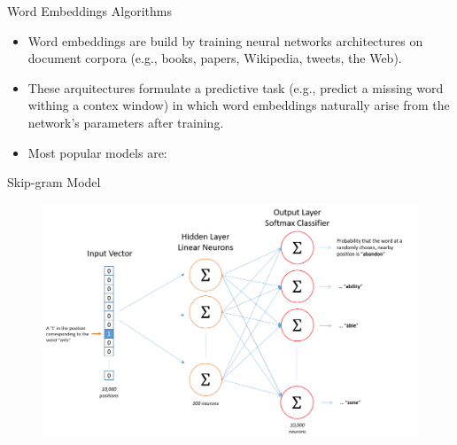\documentclass[handout]{beamer}
\begin{document}
\begin{frame}{Word Embeddings Algorithms}
\begin{scriptsize}
\begin{itemize}
\item Word embeddings are build by training neural networks architectures on document corpora (e.g., books, papers, Wikipedia, tweets, the Web).

\item These arquitectures formulate a predictive task (e.g., predict a missing word withing a contex window) in which word embeddings naturally arise from the network's parameters after training.

\item Most popular models are:




\end{itemize}
\end{scriptsize}
\end{frame}

\begin{frame}{Skip-gram Model}

  \begin{figure}[h]
        	\includegraphics[scale = 0.4]{pics/skip_gram_net_arch.png}
        \end{figure}

\end{frame}
\end{document}
